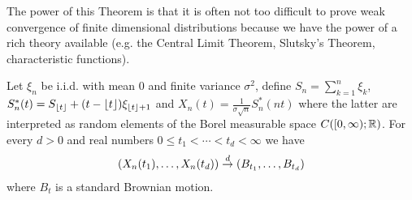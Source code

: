 The power of this Theorem is that it is often not too difficult to
prove weak convergence of finite dimensional distributions because we
have the power of a rich theory available (e.g. the Central Limit
Theorem, Slutsky's Theorem, characteristic functions).

\begin{lem}\label{ConvergenceOfRandomWalkFDD}Let $\xi_n$ be i.i.d. with mean $0$ and finite variance
  $\sigma^2$, define $S_n = \sum_{k=1}^n \xi_k$, $S_n^*(t) =
  S_{\lfloor t \rfloor} + (t - \lfloor t \rfloor)\xi_{\lfloor t \rfloor+1}$ and
  $X_n(t) = \frac{1}{\sigma \sqrt{n}} S_n^*(nt)$ where the latter are
  interpreted as random elements of the Borel measurable space
  $C([0,\infty);\mathbb{R})$.  For every $d > 0$ and real numbers $0 \leq t_1 < \cdots < t_d
  < \infty$ we have 
\begin{align*}
(X_n(t_1), \dotsc, X_n(t_d)) \overset{d}\to (B_{t_1}, \dotsc, B_{t_d})
\end{align*}
where $B_t$ is a standard Brownian motion.
\end{lem}
